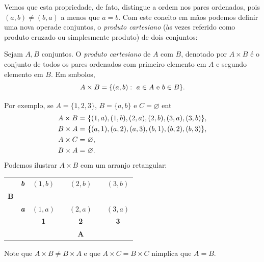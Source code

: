 Vemos que esta propriedade, de fato, distingue a ordem nos pares ordenados, pois $(a,b)\neq(b,a)$ a menos que $a=b$.  Com este coneito em m\~aos podemos definir uma nova opera\cao de conjuntos, o {\it produto cartesiano} (\`as vezes referido como produto cruzado ou simplesmente produto) de dois conjuntos:
\begin{definb}
Sejam $A,B$ conjuntos. O {\it produto cartesiano} de $A$ com $B$, denotado por $A\times B$ \'e o conjunto de todos os pares ordenados com primeiro elemento em $A$ e segundo elemento em $B$. Em s\ih mbolos,
\[
A\times B = \{(a,b):\textrm{ } a\in A \text{ e } b\in B\}.
\]
\end{definb}
Por exemplo, se $A=\{1,2,3\}$, $B=\{a,b\}$ e $C=\varnothing$ ent\ao
\begin{equation*}
 \begin{aligned}
A\times B=&\textrm{ } \{(1,a),(1,b),(2,a),(2,b),(3,a),(3,b)\},\\
B\times A=&\textrm{ } \{(a,1),(a,2),(a,3),(b,1),(b,2),(b,3)\},\\
A\times C=&\textrm{ } \varnothing,\\
B\times A=&\textrm{ } \varnothing.
 \end{aligned}
\end{equation*}
Podemos ilustrar $A\times B$ com um arranjo retangular:
\begin{table}[h]
\centering
\begin{tabular}{ccccccc}
\multicolumn{1}{c}{       } &  \multicolumn{1}{c|}{\textit{\textbf b}} & $(1,b)$ & \quad& $(2,b)$ &\quad & $(3,b)$  \\
\multicolumn{1}{c}{{\bf B}} &  \multicolumn{1}{c|}{                  } &         & \quad&         &\quad &          \\
\multicolumn{1}{c}{       } &  \multicolumn{1}{c|}{\textit{\textbf a}} & $(1,a)$ & \quad& $(2,a)$ &\quad & $(3,a)$  \\\cline{3-7}
                            &                               & {\bf 1} & \quad& {\bf 2} &\quad & {\bf 3}   \\
                            &                               &         & \quad& {\bf A} &\quad &           \\
\end{tabular}
\end{table}
Note que $A\times B\neq B\times A$ e que $A\times C=B\times C$ n\ao implica que $A=B$.

